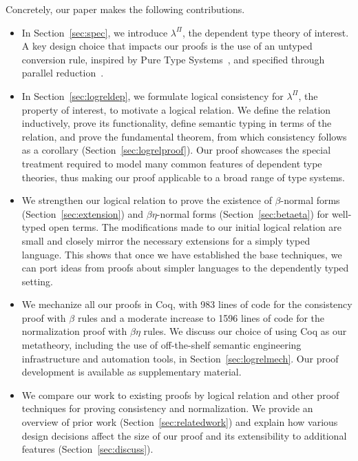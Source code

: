 \documentclass[\ifpublic nolinenum\else\fi,online,OA]{jfp}
\newcommand{\lang}{$\lambda^{\Pi}$\xspace}
\theoremstyle{definition}
\begin{document}
Concretely, our paper makes the following contributions.
\begin{itemize}
\item In Section~\ref{sec:spec}, we introduce \lang{}, the dependent type
  theory of interest. A key design choice that impacts our proofs is the use
  of an untyped conversion rule, inspired by Pure Type
  Systems~\citep{barendregt1991introduction}, and specified through parallel
  reduction~\citep{takahashi-parallel-reduction,
    barendregt:lambda-calculi-with-types}.
\item In Section~\ref{sec:logreldep}, we formulate logical consistency for
  \lang{}, the property of interest, to motivate a logical relation. We
  define the relation inductively, prove its functionality,
  define semantic typing in terms of the relation, and prove the
  fundamental theorem, from which consistency follows as a corollary
  (Section~\ref{sec:logrelproof}). Our proof
  showcases the special treatment required to model many common
  features of dependent type theories, thus making our proof applicable to a
  broad range of type systems.
\item We strengthen our logical relation to prove the existence of
  $\beta$-normal forms (Section~\ref{sec:extension}) and $\beta\eta$-normal
  forms (Section~\ref{sec:betaeta}) for well-typed open terms. The
  modifications made to our initial logical relation are small and closely
  mirror the necessary extensions for a simply typed language. This shows
  that once we have established the base techniques, we can port
  ideas from proofs about simpler languages to the dependently typed setting.
\item We mechanize all our proofs in Coq, with 983
  lines of code for the consistency proof with $\beta$ rules and a moderate
  increase to 1596 lines of code for the normalization proof with $\beta\eta$
  rules. We discuss our choice of using Coq as our metatheory,
  including the use of off-the-shelf
  semantic engineering infrastructure and automation tools, in
  Section~\ref{sec:logrelmech}. Our proof development is available as
  supplementary material.
\item We compare our work to existing proofs by logical relation and other
  proof techniques for proving consistency and normalization.  We provide an
  overview of prior work (Section~\ref{sec:relatedwork}) and explain
  how various design decisions affect the size of our
  proof and its extensibility to additional features
  (Section~\ref{sec:discuss}).
\end{itemize}
\end{document}

